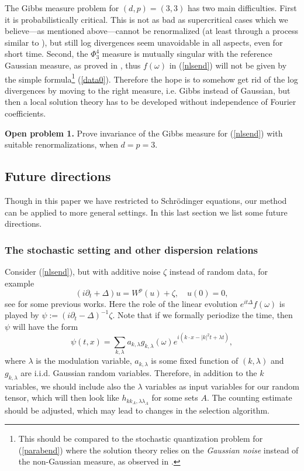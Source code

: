 \documentclass[11 pt,reqno]{amsart}
\theoremstyle{definition}
\theoremstyle{remark}
\numberwithin{equation}{section}
\begin{document}
{The Gibbs measure problem for $(d,p)=(3,3)$ has two main difficulties. First it is probabilistically critical. This is not as bad as supercritical cases which we believe---as mentioned above---cannot be renormalized (at least through a process similar to \cite{Hairer}), but still log divergences seem unavoidable in all aspects, even for short time. Second, the $\Phi_3^4$ measure is mutually singular with the reference Gaussian measure, as proved in \cite{BaGu}, thus $f(\omega)$ in (\ref{nlsend}) will not be given by the simple formula\footnote{This should be compared to the stochastic quantization problem for (\ref{parabend}) where the solution theory relies on the \emph{Gaussian noise} instead of the non-Gaussian measure, as observed in \cite{BaGu}.} (\ref{data0}). Therefore the hope is to somehow get rid of the log divergences by moving to the right measure, i.e. Gibbs instead of Gaussian, but then a local solution theory has to be developed without independence of Fourier coefficients.

{\textbf{Open problem 1.} Prove invariance of the Gibbs measure for (\ref{nlsend}) with suitable renormalizations, when $d=p=3$.
\subsection{Future directions}\label{furthercomment} Though in this paper we have restricted to Schr\"{o}dinger equations, our method can be applied to more general settings. In this last section we list some future directions.
\subsubsection{The stochastic setting and other dispersion relations} Consider (\ref{nlsend}), but with additive noise $\zeta$ instead of random data, for example
\[(i\partial_t+\Delta)u=W^p(u)+\zeta,\quad u(0)=0,\] see \cite{deD, FOW, FX, CM} for some previous works. Here the role of the linear evolution $e^{it\Delta}f(\omega)$ is played by $\psi:=(i\partial_t-\Delta)^{-1}\zeta$. Note that if we formally periodize the time, then $\psi$ will have the form
\[\psi(t,x)=\sum_{k,\lambda}a_{k,\lambda}g_{k,\lambda}(\omega)e^{i(k\cdot x-|k|^2t+\lambda t)},\] where $\lambda$ is the modulation variable, $a_{k,\lambda}$ is some fixed function of $(k,\lambda)$ and $g_{k,\lambda}$ are i.i.d. Gaussian random variables. Therefore, in addition to the $k$ variables, we should include also the $\lambda$ variables as input variables for our random tensor, which will then look like $h_{kk_A,\lambda\lambda_A}$ for some sets $A$. The counting estimate should be adjusted, which may lead to changes in the selection algorithm.

}}
\end{document}
